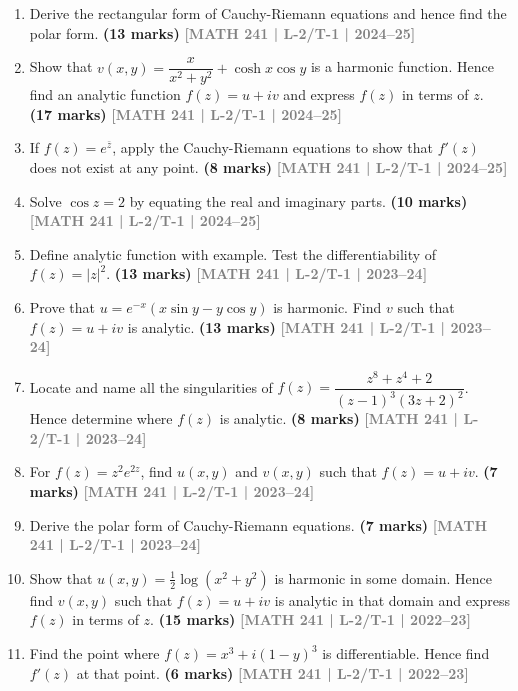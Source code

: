 \documentclass[12pt,a4paper]{article}
\newcommand{\yr}[1]{\hfill\textcolor{gray}{\small\textbf{[#1]}}}
\newcommand{\mk}[1]{\textcolor{orange!70!black}{\small\textbf{(#1 marks)}}}
\begin{document}
\begin{enumerate}\item Derive the rectangular form of Cauchy-Riemann equations and hence find the polar form.
\mk{13} \yr{MATH 241 | L-2/T-1 | 2024--25}

\item Show that $v(x,y)=\dfrac{x}{x^{2}+y^{2}}+\cosh x\cos y$ is a harmonic function. Hence find an analytic function $f(z)=u+iv$ and express $f(z)$ in terms of $z$.
\mk{17} \yr{MATH 241 | L-2/T-1 | 2024--25}

\item If $f(z)=e^{\bar{z}}$, apply the Cauchy-Riemann equations to show that $f'(z)$ does not exist at any point.
\mk{8} \yr{MATH 241 | L-2/T-1 | 2024--25}

\item Solve $\cos z=2$ by equating the real and imaginary parts.
\mk{10} \yr{MATH 241 | L-2/T-1 | 2024--25}

\item Define analytic function with example. Test the differentiability of $f(z)=|z|^{2}$.
\mk{13} \yr{MATH 241 | L-2/T-1 | 2023--24}

\item Prove that $u=e^{-x}(x\sin y - y\cos y)$ is harmonic. Find $v$ such that $f(z)=u+iv$ is analytic.
\mk{13} \yr{MATH 241 | L-2/T-1 | 2023--24}

\item Locate and name all the singularities of $f(z)=\dfrac{z^{8}+z^{4}+2}{(z-1)^{3}(3z+2)^{2}}$. Hence determine where $f(z)$ is analytic.
\mk{8} \yr{MATH 241 | L-2/T-1 | 2023--24}

\item For $f(z)=z^{2}e^{2z}$, find $u(x,y)$ and $v(x,y)$ such that $f(z)=u+iv$.
\mk{7} \yr{MATH 241 | L-2/T-1 | 2023--24}

\item Derive the polar form of Cauchy-Riemann equations.
\mk{7} \yr{MATH 241 | L-2/T-1 | 2023--24}

\item Show that $u(x,y)=\tfrac{1}{2}\log(x^{2}+y^{2})$ is harmonic in some domain. Hence find $v(x,y)$ such that $f(z)=u+iv$ is analytic in that domain and express $f(z)$ in terms of $z$.
\mk{15} \yr{MATH 241 | L-2/T-1 | 2022--23}

\item Find the point where $f(z)=x^{3}+i(1-y)^{3}$ is differentiable. Hence find $f'(z)$ at that point.
\mk{6} \yr{MATH 241 | L-2/T-1 | 2022--23}


\end{enumerate}
\end{document}
